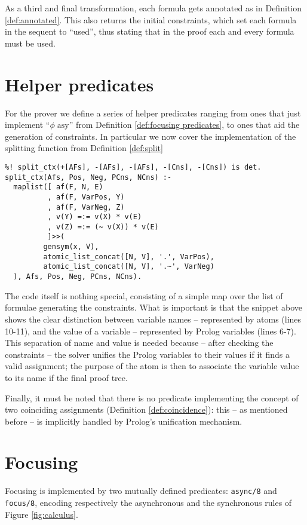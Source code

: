 As a third and final transformation, each formula gets annotated as in Definition \ref{def:annotated}.
This also returns the initial constraints, which set each formula in the sequent to ``used'', thus stating that in the proof each and every formula must be used.

\section{Helper predicates}\label{sec:helper}
For the prover we define a series of helper predicates ranging from ones that just implement ``$\phi\;\mathrm{asy}$'' from Definition \ref{def:focusing predicates}, to ones that aid the generation of constraints.
In particular we now cover the implementation of the splitting function from Definition \ref{def:split}
\begin{verbatim}
%! split_ctx(+[AFs], -[AFs], -[AFs], -[Cns], -[Cns]) is det.
split_ctx(Afs, Pos, Neg, PCns, NCns) :-
  maplist([ af(F, N, E)
          , af(F, VarPos, Y)
          , af(F, VarNeg, Z)
          , v(Y) =:= v(X) * v(E)
          , v(Z) =:= (~ v(X)) * v(E)
          ]>>(
  	     gensym(x, V),
  	     atomic_list_concat([N, V], '.', VarPos),
  	     atomic_list_concat([N, V], '.~', VarNeg)
  ), Afs, Pos, Neg, PCns, NCns).
\end{verbatim}
The code itself is nothing special, consisting of a simple map over the list of formulae generating the constraints.
What is important is that the snippet above shows the clear distinction between variable names -- represented by atoms (lines 10-11), and the value of a variable -- represented by Prolog variables (lines 6-7).
This separation of name and value is needed because -- after checking the constraints -- the solver unifies the Prolog variables to their values if it finds a valid assignment; the purpose of the atom is then to associate the variable value to its name if the final proof tree.

Finally, it must be noted that there is no predicate implementing the concept of two coinciding assignments (Definition \ref{def:coincidence}): this -- as mentioned before -- is implicitly handled by Prolog's unification mechanism.

\section{Focusing}\label{sec:focusing impl}
Focusing is implemented by two mutually defined predicates: \texttt{async/8} and \texttt{focus/8}, encoding respectively the asynchronous and the synchronous rules of Figure \ref{fig:calculus}.

